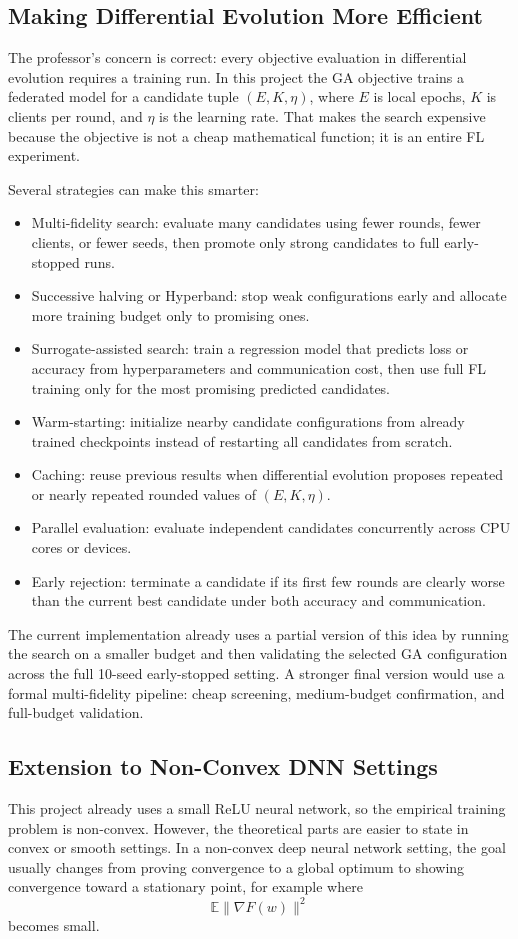 \documentclass{article}
\begin{document}
\subsection{Making Differential Evolution More Efficient}
The professor's concern is correct: every objective evaluation in differential evolution requires a training run. In this project the GA objective trains a federated model for a candidate tuple $(E,K,\eta)$, where $E$ is local epochs, $K$ is clients per round, and $\eta$ is the learning rate. That makes the search expensive because the objective is not a cheap mathematical function; it is an entire FL experiment.

Several strategies can make this smarter:
\begin{itemize}
\item Multi-fidelity search: evaluate many candidates using fewer rounds, fewer clients, or fewer seeds, then promote only strong candidates to full early-stopped runs.
\item Successive halving or Hyperband: stop weak configurations early and allocate more training budget only to promising ones.
\item Surrogate-assisted search: train a regression model that predicts loss or accuracy from hyperparameters and communication cost, then use full FL training only for the most promising predicted candidates.
\item Warm-starting: initialize nearby candidate configurations from already trained checkpoints instead of restarting all candidates from scratch.
\item Caching: reuse previous results when differential evolution proposes repeated or nearly repeated rounded values of $(E,K,\eta)$.
\item Parallel evaluation: evaluate independent candidates concurrently across CPU cores or devices.
\item Early rejection: terminate a candidate if its first few rounds are clearly worse than the current best candidate under both accuracy and communication.
\end{itemize}

The current implementation already uses a partial version of this idea by running the search on a smaller budget and then validating the selected GA configuration across the full 10-seed early-stopped setting. A stronger final version would use a formal multi-fidelity pipeline: cheap screening, medium-budget confirmation, and full-budget validation.

\subsection{Extension to Non-Convex DNN Settings}
This project already uses a small ReLU neural network, so the empirical training problem is non-convex. However, the theoretical parts are easier to state in convex or smooth settings. In a non-convex deep neural network setting, the goal usually changes from proving convergence to a global optimum to showing convergence toward a stationary point, for example where
\[
\mathbb{E}\|\nabla F(w)\|^2
\]
becomes small.
\end{document}
